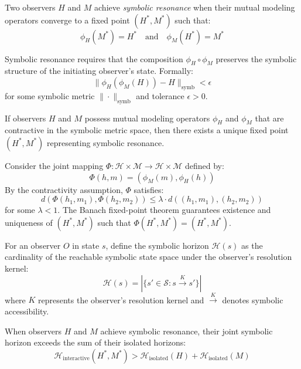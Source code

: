 \begin{definition}
\label{definition:bk7_symbolic_resonance}
Two observers $H$ and $M$ achieve \emph{symbolic resonance} when their mutual modeling operators converge to a fixed point $(H^*, M^*)$ such that:
$$\phi_H(M^*) = H^* \quad \text{and} \quad \phi_M(H^*) = M^*$$
\end{definition}

\begin{lemma}
\label{lemma:bk7_information_preservation}
Symbolic resonance requires that the composition $\phi_H \circ \phi_M$ preserves the symbolic structure of the initiating observer's state. Formally:
$$\|\phi_H(\phi_M(H)) - H\|_{\text{symb}} < \epsilon$$
for some symbolic metric $\|\cdot\|_{\text{symb}}$ and tolerance $\epsilon > 0$.
\end{lemma}

\begin{theorem}
\label{theorem:bk7_two_way_street_fixed_point}
If observers $H$ and $M$ possess mutual modeling operators $\phi_H$ and $\phi_M$ that are contractive in the symbolic metric space, then there exists a unique fixed point $(H^*, M^*)$ representing symbolic resonance.
\end{theorem}

\begin{demonstratio}
Consider the joint mapping $\Phi: \mathcal{H} \times \mathcal{M} \to \mathcal{H} \times \mathcal{M}$ defined by:
$$\Phi(h, m) = (\phi_M(m), \phi_H(h))$$
By the contractivity assumption, $\Phi$ satisfies:
$$d(\Phi(h_1, m_1), \Phi(h_2, m_2)) \leq \lambda \cdot d((h_1, m_1), (h_2, m_2))$$
for some $\lambda < 1$. The Banach fixed-point theorem guarantees existence and uniqueness of $(H^*, M^*)$ such that $\Phi(H^*, M^*) = (H^*, M^*)$.
\end{demonstratio}

\begin{definition}
\label{definition:bk7_symbolic_horizon}
For an observer $O$ in state $s$, define the symbolic horizon $\mathcal{H}(s)$ as the cardinality of the reachable symbolic state space under the observer's resolution kernel:
$$\mathcal{H}(s) = |\{s' \in \mathcal{S} : s \xrightarrow{K} s'\}|$$
where $K$ represents the observer's resolution kernel and $\xrightarrow{K}$ denotes symbolic accessibility.
\end{definition}

\begin{proposition}
\label{proposition:bk7_horizon_expansion}
When observers $H$ and $M$ achieve symbolic resonance, their joint symbolic horizon exceeds the sum of their isolated horizons:
$$\mathcal{H}_{\text{interactive}}(H^*, M^*) > \mathcal{H}_{\text{isolated}}(H) + \mathcal{H}_{\text{isolated}}(M)$$
\end{proposition}

